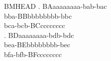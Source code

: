 
\GlossMorphAlign

\begin{frame}{BMHEAD}
\ex. \glll BAaaaaaaaa-bab-bac \\
           bba-BBbbbbbbbb-bbc \\
           bca-bcb-BCcccccccc \\
\pause
\ex. \glll BDaaaaaaaa-bdb-bdc \\
           bea-BEbbbbbbbb-bec \\
           bfa-bfb-BFcccccccc \\
\end{frame}

